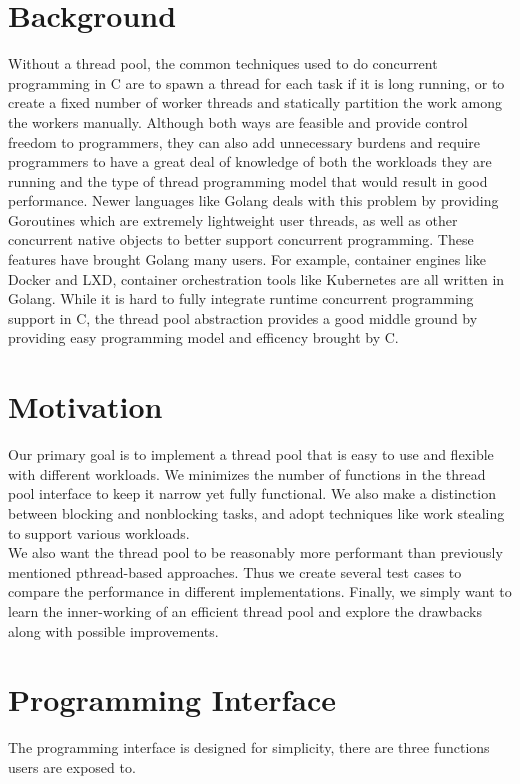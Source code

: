 \documentclass[journal, a4paper]{IEEEtran}
\begin{document}
\section{Background}	
	Without a thread pool, the common techniques used to do concurrent programming in C are to spawn a thread for each task if it is long running, or to create a fixed number of worker threads and statically partition the work among the workers manually. Although both ways are feasible and provide control freedom to programmers, they can also add unnecessary burdens and require programmers to have a great deal of knowledge of both the workloads they are running and the type of thread programming model that would result in good performance. Newer languages like Golang deals with this problem by providing Goroutines which are extremely lightweight user threads, as well as other concurrent native objects to better support concurrent programming. These features have brought Golang many users. For example, container engines like Docker and LXD, container orchestration tools like Kubernetes are all written in Golang. While it is hard to fully integrate runtime concurrent programming support in C, the thread pool abstraction provides a good middle ground by providing easy programming model and efficency brought by C.
		

\section{Motivation}
	Our primary goal is to implement a thread pool that is easy to use and flexible with different workloads. We minimizes the number of functions in the thread pool interface to keep it narrow yet fully functional. We also make a distinction between blocking and nonblocking tasks, and adopt techniques like work stealing to support various workloads.\\
	We also want the thread pool to be reasonably more performant than previously mentioned pthread-based approaches. Thus we create several test cases to compare the performance in different implementations. Finally, we simply want to learn the inner-working of an efficient thread pool and explore the drawbacks along with possible improvements.\\
	
\section{Programming Interface}
The programming interface is designed for simplicity, there are three functions users are exposed to.\\
\end{document}
